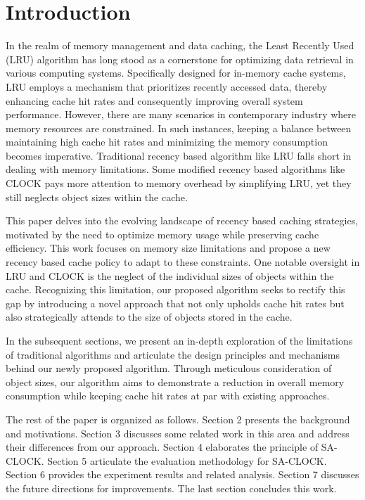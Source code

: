 \documentclass[journal,10.5pt,onecolumn]{IEEEtran}
\begin{document}
\section{Introduction}
In the realm of memory management and data caching, the Least Recently Used (LRU) algorithm has long stood as a cornerstone for optimizing data retrieval in various computing systems. Specifically designed for in-memory cache systems, LRU employs a mechanism that prioritizes recently accessed data, thereby enhancing cache hit rates and consequently improving overall system performance. However, there are many scenarios in contemporary industry where memory resources are constrained. In such instances, keeping a balance between maintaining high cache hit rates and minimizing the memory consumption becomes imperative. Traditional recency based algorithm like LRU falls short in dealing with memory limitations. Some modified recency based algorithms like CLOCK pays more attention to memory overhead by simplifying LRU, yet they still neglects object sizes within the cache.

This paper delves into the evolving landscape of recency based caching strategies, motivated by the need to optimize memory usage while preserving cache efficiency. This work focuses on memory size limitations and propose a new recency based cache policy to adapt to these constraints. One notable oversight in LRU and CLOCK is the neglect of the individual sizes of objects within the cache. Recognizing this limitation, our proposed algorithm seeks to rectify this gap by introducing a novel approach that not only upholds cache hit rates but also strategically attends to the size of objects stored in the cache.

In the subsequent sections, we present an in-depth exploration of the limitations of traditional algorithms and articulate the design principles and mechanisms behind our newly proposed algorithm. Through meticulous consideration of object sizes, our algorithm aims to demonstrate a reduction in overall memory consumption while keeping cache hit rates at par with existing approaches. 

The rest of the paper is organized as follows. Section 2 presents the background and motivations. Section 3 discusses some related work in this area and address their differences from our approach. Section 4 elaborates the principle of SA-CLOCK. Section 5 articulate the evaluation methodology for SA-CLOCK. Section 6 provides the experiment results and related analysis. Section 7 discusses the future directions for improvements. The last section concludes this work.
\end{document}
